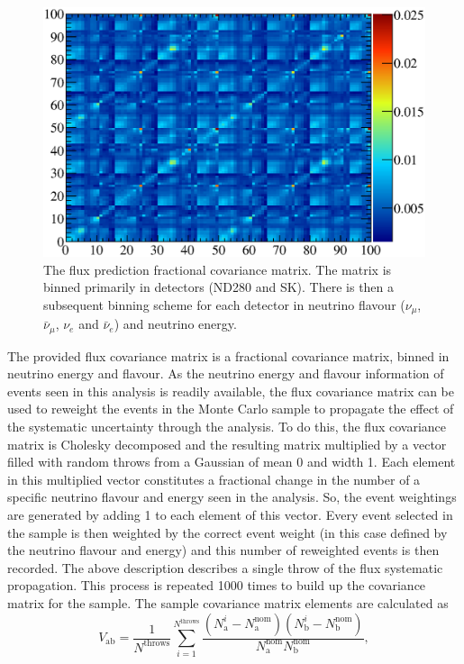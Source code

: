 \begin{figure}
  \centering
  \includegraphics[width=12cm]{images/measurement/systematics/flux/flux_prediction_syst.eps}
  \caption{The flux prediction fractional covariance matrix.  The matrix is binned primarily in detectors (ND280 and SK).  There is then a subsequent binning scheme for each detector in neutrino flavour ($\nu_\mu$, $\bar{\nu}_\mu$, $\nu_e$ and $\bar{\nu}_e$) and neutrino energy.}
  \label{fig:FluxPredictionSyst}
\end{figure}
The provided flux covariance matrix is a fractional covariance matrix, binned in neutrino energy and flavour.  As the neutrino energy and flavour information of events seen in this analysis is readily available, the flux covariance matrix can be used to reweight the events in the Monte Carlo sample to propagate the effect of the systematic uncertainty through the analysis.  To do this, the flux covariance matrix is Cholesky decomposed and the resulting matrix multiplied by a vector filled with random throws from a Gaussian of mean 0 and width 1.  Each element in this multiplied vector constitutes a fractional change in the number of a specific neutrino flavour and energy seen in the analysis.  So, the event weightings are generated by adding 1 to each element of this vector.  Every event selected in the sample is then weighted by the correct event weight (in this case defined by the neutrino flavour and energy) and this number of reweighted events is then recorded.  The above description describes a single throw of the flux systematic propagation.  This process is repeated 1000 times to build up the covariance matrix for the sample.  The sample covariance matrix elements are calculated as
\begin{equation}
  V_{\textrm{ab}} = \frac{1}{N^{\textrm{throws}}}\sum^{N^{\textrm{throws}}}_{i=1}\frac{\left(N_{\textrm{a}}^{i} - N_{\textrm{a}}^{\textrm{nom}}\right)\left(N_{\textrm{b}}^{i} - N_{\textrm{b}}^{\textrm{nom}}\right)}{N_{\textrm{a}}^{\textrm{nom}}N_{\textrm{b}}^{\textrm{nom}}},
  \label{eqn:CovarianceMatrixElementDef}
\end{equation}
